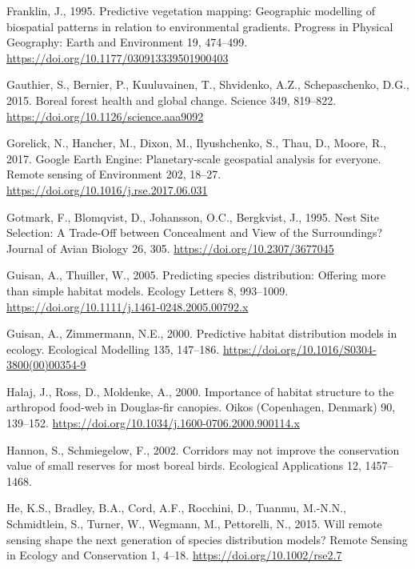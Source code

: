 \documentclass[
]{article}
\newlength{\cslhangindent}
\newlength{\cslentryspacingunit} %
\newenvironment{CSLReferences}[2] %
 {%
  \setlength{\parindent}{0pt}
  \ifodd #1
  \let\oldpar\par
  \def\par{\hangindent=\cslhangindent\oldpar}
  \fi
  \setlength{\parskip}{#2\cslentryspacingunit}
 }%
 {}
\begin{document}
\begin{CSLReferences}{1}{0}
\leavevmode{}%
Franklin, J., 1995. Predictive vegetation mapping: Geographic modelling of biospatial patterns in relation to environmental gradients. Progress in Physical Geography: Earth and Environment 19, 474--499. \url{https://doi.org/10.1177/030913339501900403}

\leavevmode{}%
Gauthier, S., Bernier, P., Kuuluvainen, T., Shvidenko, A.Z., Schepaschenko, D.G., 2015. Boreal forest health and global change. Science 349, 819--822. \url{https://doi.org/10.1126/science.aaa9092}

\leavevmode{}%
Gorelick, N., Hancher, M., Dixon, M., Ilyushchenko, S., Thau, D., Moore, R., 2017. Google {Earth} {Engine}: {Planetary}-scale geospatial analysis for everyone. Remote sensing of Environment 202, 18--27. \url{https://doi.org/10.1016/j.rse.2017.06.031}

\leavevmode{}%
Gotmark, F., Blomqvist, D., Johansson, O.C., Bergkvist, J., 1995. Nest {Site} {Selection}: {A} {Trade}-{Off} between {Concealment} and {View} of the {Surroundings}? Journal of Avian Biology 26, 305. \url{https://doi.org/10.2307/3677045}

\leavevmode{}%
Guisan, A., Thuiller, W., 2005. Predicting species distribution: Offering more than simple habitat models. Ecology Letters 8, 993--1009. \url{https://doi.org/10.1111/j.1461-0248.2005.00792.x}

\leavevmode{}%
Guisan, A., Zimmermann, N.E., 2000. Predictive habitat distribution models in ecology. Ecological Modelling 135, 147--186. \url{https://doi.org/10.1016/S0304-3800(00)00354-9}

\leavevmode{}%
Halaj, J., Ross, D., Moldenke, A., 2000. Importance of habitat structure to the arthropod food-web in {Douglas}-fir canopies. Oikos (Copenhagen, Denmark) 90, 139--152. \url{https://doi.org/10.1034/j.1600-0706.2000.900114.x}

\leavevmode{}%
Hannon, S., Schmiegelow, F., 2002. Corridors may not improve the conservation value of small reserves for most boreal birds. Ecological Applications 12, 1457--1468.

\leavevmode{}%
He, K.S., Bradley, B.A., Cord, A.F., Rocchini, D., Tuanmu, M.-N.N., Schmidtlein, S., Turner, W., Wegmann, M., Pettorelli, N., 2015. Will remote sensing shape the next generation of species distribution models? Remote Sensing in Ecology and Conservation 1, 4--18. \url{https://doi.org/10.1002/rse2.7}


\end{CSLReferences}
\end{document}
